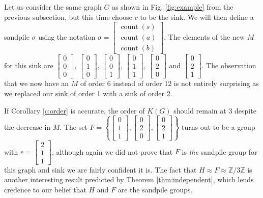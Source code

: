 \documentclass[12pt]{article}
\DeclareMathOperator{\ct}{count}
\begin{document}
Let us consider the same graph $G$ as shown in Fig. \ref{fig:example} from the previous subsection, but this time choose $c$ to be the sink.  We will then define a sandpile $\sigma$ using the notation $\sigma = \begin{bmatrix} \ct(s) \\ \ct(a) \\ \ct(b)\end{bmatrix}$.  The elements of the new $M$ for this sink are   
$\begin{bmatrix}0 \\ 0 \\ 0 \end{bmatrix}$,
$\begin{bmatrix}0 \\ 1 \\ 0 \end{bmatrix}$,
$\begin{bmatrix}0 \\ 0 \\ 1 \end{bmatrix}$,
$\begin{bmatrix}0 \\ 1 \\ 1 \end{bmatrix}$,
$\begin{bmatrix}0 \\ 2 \\ 0 \end{bmatrix}$ and
$\begin{bmatrix}0 \\ 2 \\ 1 \end{bmatrix}$.  The observation that we now have an $M$ of order 6 instead of order 12 is not entirely surprising as we replaced our sink of order 1 with a sink of order 2.

If Corollary \ref{c:order} is accurate, the order of $K(G)$ should remain at 3 despite the decrease in $M$.  The set $F= \left\{\begin{bmatrix}0 \\ 1 \\ 1 \end{bmatrix}, \begin{bmatrix}0 \\ 2 \\ 0 \end{bmatrix}, \begin{bmatrix} 0 \\ 2 \\ 1 \end{bmatrix} \right\}$ turns out to be a group with $e=\begin{bmatrix}2 \\ 1 \\ 1 \end{bmatrix}$, although again we did not prove that $F$ is \textit{the} sandpile group for this graph and sink we are fairly confident it is.  The fact that $H \approx F \approx \mathbb{Z}/3 \mathbb{Z}$ is another interesting result predicted by Theorem \ref{thm:independent}, which lends credence to our belief that $H$ and $F$ are the sandpile groups.  




\end{document}
